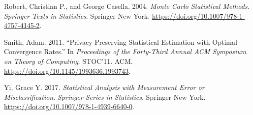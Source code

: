 \begin{CSLReferences}{1}{0}
\leavevmode{}%
Robert, Christian P., and George Casella. 2004. \emph{Monte Carlo Statistical Methods}. \emph{Springer Texts in Statistics}. Springer New York. \url{https://doi.org/10.1007/978-1-4757-4145-2}.

\leavevmode{}%
Smith, Adam. 2011. {``Privacy-Preserving Statistical Estimation with Optimal Convergence Rates.''} In \emph{Proceedings of the Forty-Third Annual ACM Symposium on Theory of Computing}. STOC'11. ACM. \url{https://doi.org/10.1145/1993636.1993743}.

\leavevmode{}%
Yi, Grace Y. 2017. \emph{Statistical Analysis with Measurement Error or Misclassification}. \emph{Springer Series in Statistics}. Springer New York. \url{https://doi.org/10.1007/978-1-4939-6640-0}.

\end{CSLReferences}



\address{%
Kevin Eng\\
Rutgers University\\%
Department of Statistics\\ Piscataway, NJ 08854\\
%
\url{https://www.britannica.com/animal/quokka}\\%
%
\href{mailto:ke157@stat.rutgers.edu}{\nolinkurl{ke157@stat.rutgers.edu}}%
}

\address{%
Jordan A. Awan\\
Purdue University\\%
Department of Statistics\\ West Lafayette, IN 47907\\
%
\url{https://www.britannica.com/animal/quokka}\\%
%
\href{mailto:jawan@purdue.edu}{\nolinkurl{jawan@purdue.edu}}%
}

\address{%
Ruobin Gong\\
Rutgers University\\%
Department of Statistics\\ Piscataway, NJ 08854\\
%
\url{https://www.britannica.com/animal/quokka}\\%
%
\href{mailto:ruobin.gong@rutgers.edu}{\nolinkurl{ruobin.gong@rutgers.edu}}%
}

\address{%
Nianqiao Phyllis Ju\\
Purdue University\\%
Department of Statistics\\ West Lafayette, IN 47907\\
%
\url{https://www.britannica.com/animal/quokka}\\%
%
\href{mailto:nianqiao@purdue.edu}{\nolinkurl{nianqiao@purdue.edu}}%
}

\address{%
Vinayak A. Rao\\
Purdue University\\%
Department of Statistics\\ West Lafayette, IN 47907\\
%
\url{https://www.britannica.com/animal/quokka}\\%
%
\href{mailto:varao@purdue.edu}{\nolinkurl{varao@purdue.edu}}%
}
